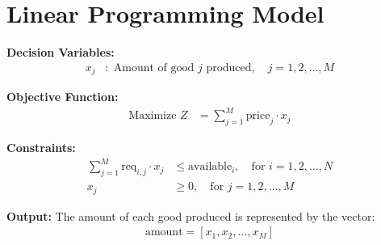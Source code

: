 \documentclass{article}
\begin{document}
\section*{Linear Programming Model}

\textbf{Decision Variables:}
\begin{align*}
x_j & : \text{ Amount of good } j \text{ produced}, \quad j = 1, 2, \ldots, M
\end{align*}

\textbf{Objective Function:}
\begin{align*}
\text{Maximize } Z &= \sum_{j=1}^{M} \text{price}_j \cdot x_j
\end{align*}

\textbf{Constraints:}
\begin{align*}
\sum_{j=1}^{M} \text{req}_{i,j} \cdot x_j & \leq \text{available}_i, \quad \text{for } i = 1, 2, \ldots, N \\
x_j & \geq 0, \quad \text{for } j = 1, 2, \ldots, M
\end{align*}

\textbf{Output:}
The amount of each good produced is represented by the vector:
\begin{align*}
\text{amount} = [x_1, x_2, \ldots, x_M]
\end{align*}
\end{document}
